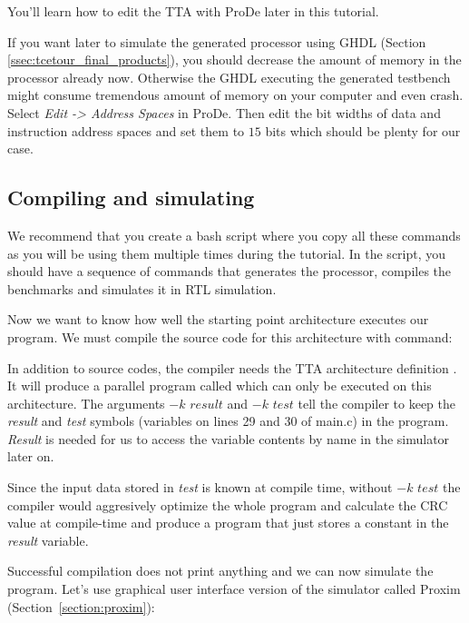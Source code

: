\documentclass[a4paper,twoside]{tceusermanual}
\begin{document}
You'll learn how to edit the TTA with ProDe later in this tutorial.

If you want later to simulate the generated processor using GHDL
(Section \ref{ssec:tcetour_final_products}), you should decrease the
amount of memory in the processor already now. Otherwise the GHDL
executing the generated testbench might consume tremendous amount of
memory on your computer and even crash. Select
\textit{Edit -> Address Spaces} in ProDe. Then edit the bit widths of
data and instruction address spaces and set them to $15$ bits which
should be plenty for our case.


\subsection{Compiling and simulating}
We recommend that you create a bash script where you copy all these commands
as you will be using them multiple times during the tutorial. In the script,
you should have a sequence of commands that generates the processor, compiles
the benchmarks and simulates it in RTL simulation.

Now we want to know how well the starting point architecture executes
our program. We must compile the source code for this architecture
with command:


In addition to source codes, the compiler needs the TTA architecture
definition . It will produce a parallel program called
 which can only be executed on this architecture. The arguments
$-k$ $result$ and $-k$ $test$ tell the compiler to keep the \textit{result} and
\textit{test} symbols (variables on lines 29 and 30 of main.c) in the program.
\textit{Result} is needed for us to access the variable contents by name in the
simulator later on.

Since the input data stored in \textit{test} is known at compile time,
without $-k$ $test$ the compiler would aggresively optimize the whole program
and calculate the CRC value at compile-time and produce a program that
just stores a constant in the \textit{result} variable.

Successful compilation does not print anything and we can now simulate
the program. Let's use graphical user interface version of the
simulator called Proxim (Section~\ref{section:proxim}):

\end{document}
